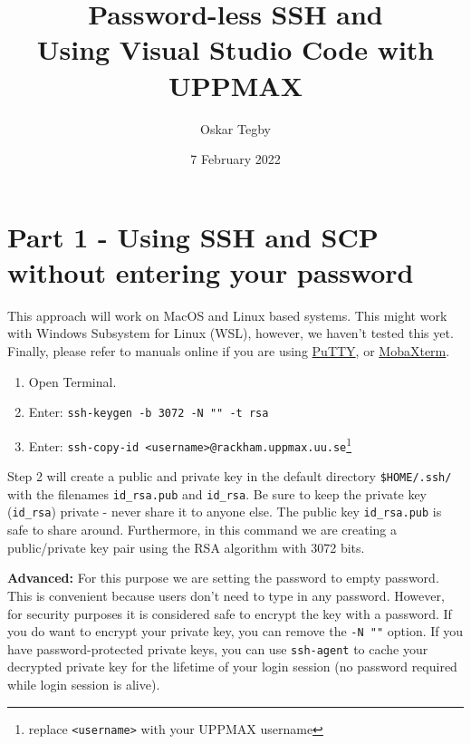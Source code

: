 \documentclass[10pt]{article}
\title{Password-less SSH and \\ Using Visual Studio Code with UPPMAX}
\author{Oskar Tegby}
\date{7 February 2022}
\begin{document}
\maketitle

\section{Part 1 - Using SSH and SCP without entering your password}
This approach will work on MacOS and Linux based systems. This might work with Windows Subsystem for Linux
(WSL), however, we haven't tested this yet. Finally, please refer to manuals online if you are using
\href{https://devops.ionos.com/tutorials/use-ssh-keys-with-putty-on-windows/}{PuTTY}, or
\href{https://ubccr.freshdesk.com/support/solutions/articles/13000034093-using-ssh-keys-with-mobaxterm-windows-}{MobaXterm}.

\begin{enumerate}
\item Open Terminal.
\item Enter: \texttt{ssh-keygen -b 3072 -N "" -t rsa}
\item Enter: \texttt{ssh-copy-id <username>@rackham.uppmax.uu.se}\footnote{replace
\texttt{<username>} with your
UPPMAX username}
\end{enumerate}

Step 2 will create a public and private key in the default directory \texttt{\$HOME/.ssh/} with the
filenames \texttt{id\_rsa.pub} and \texttt{id\_rsa}. Be sure to keep the private key (\texttt{id\_rsa})
private - never share it to anyone else. The public key \texttt{id\_rsa.pub} is safe to share
around. Furthermore, in this command we are creating a public/private key pair using the RSA
algorithm with 3072 bits. 

\textbf{Advanced: }For this purpose we are setting the password to empty password. This is
convenient because users don't need to type in any password. However, for security purposes it is
considered safe to encrypt the key with a password. If you do want to encrypt your private key, you
can remove the \texttt{-N ""} option. If you have password-protected private keys, you can use
\texttt{ssh-agent} to cache your decrypted private key for the lifetime of your login session (no
password required while login session is alive).

\end{document}
